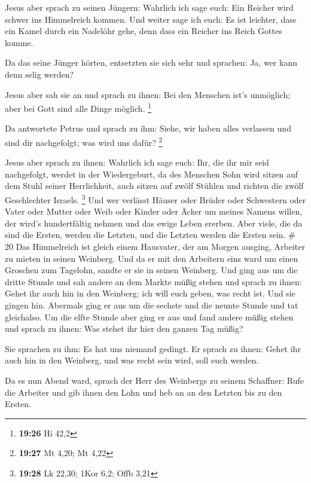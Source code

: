  Jesus aber sprach zu seinen Jüngern: Wahrlich ich sage
euch: Ein Reicher wird schwer ins Himmelreich kommen.  Und
weiter sage ich euch: Es ist leichter, dass ein Kamel durch ein Nadelöhr
gehe, denn dass ein Reicher ins Reich Gottes komme.

 Da das seine Jünger hörten, entsetzten sie sich sehr und
sprachen: Ja, wer kann denn selig werden?

 Jesus aber sah sie an und sprach zu ihnen: Bei den
Menschen ist's unmöglich; aber bei Gott sind alle Dinge möglich.
\footnote{\textbf{19:26} Hi 42,2}

 Da antwortete Petrus und sprach zu ihm: Siehe, wir haben
alles verlassen und sind dir nachgefolgt; was wird uns dafür?
\footnote{\textbf{19:27} Mt 4,20; Mt 4,22}

 Jesus aber sprach zu ihnen: Wahrlich ich sage euch: Ihr,
die ihr mir seid nachgefolgt, werdet in der Wiedergeburt, da des
Menschen Sohn wird sitzen auf dem Stuhl seiner Herrlichkeit, auch sitzen
auf zwölf Stühlen und richten die zwölf Geschlechter Israels.
\footnote{\textbf{19:28} Lk 22,30; 1Kor 6,2; Offb 3,21} 
Und wer verlässt Häuser oder Brüder oder Schwestern oder Vater oder
Mutter oder Weib oder Kinder oder Äcker um meines Namens willen, der
wird's hundertfältig nehmen und das ewige Leben ererben. 
Aber viele, die da sind die Ersten, werden die Letzten, und die Letzten
werden die Ersten sein. \# 20  Das Himmelreich ist gleich
einem Hausvater, der am Morgen ausging, Arbeiter zu mieten in seinen
Weinberg.  Und da er mit den Arbeitern eins ward um einen
Groschen zum Tagelohn, sandte er sie in seinen Weinberg. 
Und ging aus um die dritte Stunde und sah andere an dem Markte müßig
stehen  und sprach zu ihnen: Gehet ihr auch hin in den
Weinberg; ich will euch geben, was recht ist.  Und sie
gingen hin. Abermals ging er aus um die sechste und die neunte Stunde
und tat gleichalso.  Um die elfte Stunde aber ging er aus
und fand andere müßig stehen und sprach zu ihnen: Was stehet ihr hier
den ganzen Tag müßig?

 Sie sprachen zu ihm: Es hat uns niemand gedingt. Er sprach
zu ihnen: Gehet ihr auch hin in den Weinberg, und was recht sein wird,
soll euch werden.

 Da es nun Abend ward, sprach der Herr des Weinbergs zu
seinem Schaffner: Rufe die Arbeiter und gib ihnen den Lohn und heb an an
den Letzten bis zu den Ersten.

